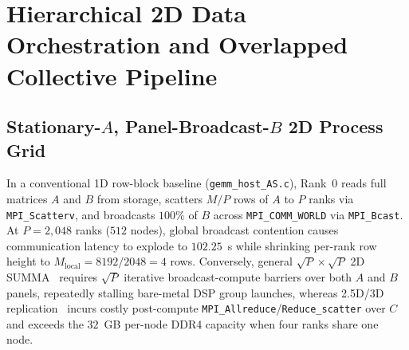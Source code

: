 \documentclass[journal]{IEEEtran}
\begin{document}
\section{Hierarchical 2D Data Orchestration and Overlapped Collective Pipeline}
\label{sec:host_2d}

\subsection{Stationary-$A$, Panel-Broadcast-$B$ 2D Process Grid}
In a conventional 1D row-block baseline (\texttt{gemm\_host\_AS.c}), Rank~0 reads full matrices $A$ and $B$ from storage, scatters $M/P$ rows of $A$ to $P$ ranks via \texttt{MPI\_Scatterv}, and broadcasts $100\%$ of $B$ across \texttt{MPI\_COMM\_WORLD} via \texttt{MPI\_Bcast}. At $P = 2{,}048$ ranks ($512$ nodes), global broadcast contention causes communication latency to explode to $102.25$~s while shrinking per-rank row height to $M_{\mathrm{local}} = 8192 / 2048 = 4$ rows. Conversely, general $\sqrt{P} \times \sqrt{P}$ 2D SUMMA~\cite{vandegeijn1997summa} requires $\sqrt{P}$ iterative broadcast-compute barriers over both $A$ and $B$ panels, repeatedly stalling bare-metal DSP group launches, whereas 2.5D/3D replication~\cite{solomonik2011comm25d} incurs costly post-compute \texttt{MPI\_Allreduce}/\texttt{Reduce\_scatter} over $C$ and exceeds the $32$~GB per-node DDR4 capacity when four ranks share one node.
\end{document}
